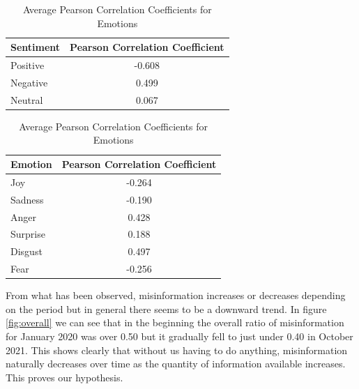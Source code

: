 \documentclass{l4proj}
\begin{document}
\begin{table}[H]
\begin{minipage}[c]{0.45\linewidth}
\centering
\begin{tabular}{@{}lc@{}}
\toprule
Sentiment  & \multicolumn{1}{l}{Pearson Correlation Coefficient} \\ \midrule
Positive      & -0.608                                              \\
Negative  & 0.499                                              \\
Neutral     & 0.067                                              \\ \bottomrule
\end{tabular}
\caption{Average Pearson Correlation Coefficients for Sentiment}
\label{tab:avgsen}
\end{minipage}\hfill
\begin{minipage}[c]{0.45\linewidth}
\centering
\begin{tabular}{@{}lc@{}}
\toprule
Emotion  & \multicolumn{1}{l}{Pearson Correlation Coefficient} \\ \midrule
Joy      & -0.264                                              \\
Sadness  & -0.190                                              \\
Anger    & 0.428                                               \\
Surprise & 0.188                                               \\
Disgust  & 0.497                                               \\
Fear     & -0.256                                              \\ \bottomrule
\end{tabular}
\caption{Average Pearson Correlation Coefficients for Emotions}
\label{tab:avgemo}
\end{minipage}
\end{table}

From what has been observed, misinformation increases or decreases depending on the period but in general there seems to be a downward trend. In figure \ref{fig:overall} we can see that in the beginning the overall ratio of misinformation for January 2020 was over 0.50 but it gradually fell to just under 0.40 in October 2021. This shows clearly that without us having to do anything, misinformation naturally decreases over time as the quantity of information available increases. This proves our hypothesis.
\end{document}
